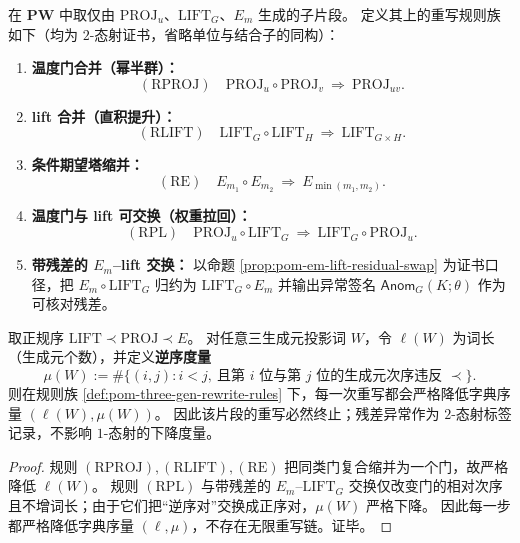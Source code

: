 \begin{definition}[三生成元片段上的重写规则族]\label{def:pom-three-gen-rewrite-rules}
在 $\mathbf{PW}$ 中取仅由 \(\mathrm{PROJ}_u\)、\(\mathrm{LIFT}_G\)、\(E_m\) 生成的子片段。
定义其上的重写规则族如下（均为 $2$-态射证书，省略单位与结合子的同构）：
\begin{enumerate}
  \item \textbf{温度门合并（幂半群）：}
  $$
  (\mathrm{RPROJ})\quad
  \mathrm{PROJ}_u\circ \mathrm{PROJ}_v\ \Rightarrow\ \mathrm{PROJ}_{uv}.
  $$
  \item \textbf{lift 合并（直积提升）：}
  $$
  (\mathrm{RLIFT})\quad
  \mathrm{LIFT}_G\circ \mathrm{LIFT}_H\ \Rightarrow\ \mathrm{LIFT}_{G\times H}.
  $$
  \item \textbf{条件期望塔缩并：}
  $$
  (\mathrm{RE})\quad
  E_{m_1}\circ E_{m_2}\ \Rightarrow\ E_{\min(m_1,m_2)}.
  $$
  \item \textbf{温度门与 lift 可交换（权重拉回）：}
  $$
  (\mathrm{RPL})\quad
  \mathrm{PROJ}_u\circ \mathrm{LIFT}_G\ \Rightarrow\ \mathrm{LIFT}_G\circ \mathrm{PROJ}_u.
  $$
  \item \textbf{带残差的 \(E_m\)--lift 交换：}
  以命题 \ref{prop:pom-em-lift-residual-swap} 为证书口径，把 \(E_m\circ\mathrm{LIFT}_G\) 归约为 \(\mathrm{LIFT}_G\circ E_m\) 并输出异常签名 \(\mathsf{Anom}_G(K;\theta)\) 作为可核对残差。
\end{enumerate}
\end{definition}

\begin{proposition}\label{prop:pom-three-gen-termination}
取正规序
\(
\mathrm{LIFT}\prec \mathrm{PROJ}\prec E
\)。
对任意三生成元投影词 \(W\)，令 \(\ell(W)\) 为词长（生成元个数），并定义\textbf{逆序度量}
\[
\mu(W):=\#\{(i,j):i<j,\ \text{且第 }i\text{ 位与第 }j\text{ 位的生成元次序违反 }\prec\}.
\]
则在规则族 \ref{def:pom-three-gen-rewrite-rules} 下，每一次重写都会严格降低字典序量
\(
(\ell(W),\mu(W))
\)。
因此该片段的重写必然终止；残差异常作为 \(2\)-态射标签记录，不影响 \(1\)-态射的下降度量。
\end{proposition}
\begin{proof}
规则 \((\mathrm{RPROJ}),(\mathrm{RLIFT}),(\mathrm{RE})\) 把同类门复合缩并为一个门，故严格降低 \(\ell(W)\)。
规则 \((\mathrm{RPL})\) 与带残差的 \(E_m\)--\(\mathrm{LIFT}_G\) 交换仅改变门的相对次序且不增词长；由于它们把“逆序对”交换成正序对，\(\mu(W)\) 严格下降。
因此每一步都严格降低字典序量 \((\ell,\mu)\)，不存在无限重写链。证毕。
\end{proof}

